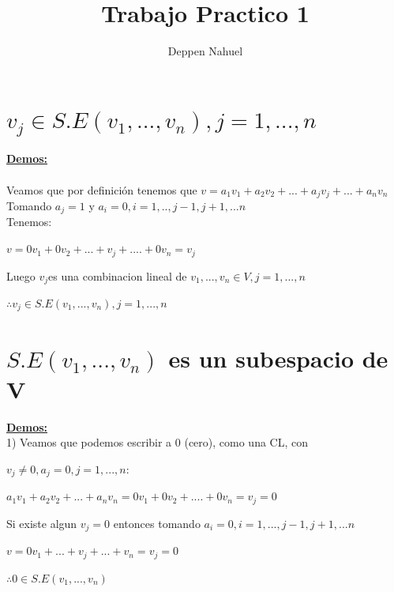 \documentclass[12 pt]{article}
\title{Trabajo Practico 1}
\author{Deppen Nahuel}
\date{}
\begin{document}
\maketitle



\section{${v}_{j}\in S.E({v}_{1},...,{v}_{n}), j=1,...,n$}
\underline{\textbf{Demos:}}  \\
\\
  Veamos que por definición tenemos que $v={a}_{1}{v}_{1}+{a}_{2}{v}_{2}+...+{a}_{j}{v}_{j}+...+{a}_{n}{v}_{n}$
 Tomando ${a}_{j}=1$ y ${a}_{i}=0, i=1,..,j-1,j+1,...n$ \\ Tenemos:\\
 
  \begin{center} $v=0{v}_{1}+0{v}_{2}+...+{v}_{j}+....+0{v}_{n}={v}_{j}$
\end{center}

 Luego ${v}_{j} $es una combinacion lineal de ${v}_{1},...,{v}_{n}\in V, j=1,...,n$
 
 \begin{center}
 	$ \therefore {v}_{j} \in  S.E({v}_{1},...,{v}_{n}), j=1,...,n$
 \end{center} 
 
 

 \newpage
\section{$S.E({v}_{1},...,{v}_{n})$ es un subespacio de V}
\underline {\textbf{Demos:}}\\
1) Veamos que podemos escribir a 0 (cero), como una CL, con

${v}_{j}\neq0, {a}_{j}=0, j=1,...,n$:

\begin{center}
	${a}_{1}{v}_{1}+{a}_{2}{v}_{2}+...+{a}_{n}{v}_{n}=
	0{v}_{1}+0{v}_{2}+....+0{v}_{n}={v}_{j}=0 $ 
	
\end{center}

 
Si existe algun ${v}_{j}=0$ entonces tomando $ {a}_{i}=0, i=1,...,j-1,j+1,...n$

\begin{center}
	$v=0{v}_{1}+...+{v}_{j}+...+{v}_{n}={v}_{j}=0$
\end{center}
\begin{center}
$ \therefore 0 \in S.E({v}_{1},...,{v}_{n})$
\end{center}
\end{document}
